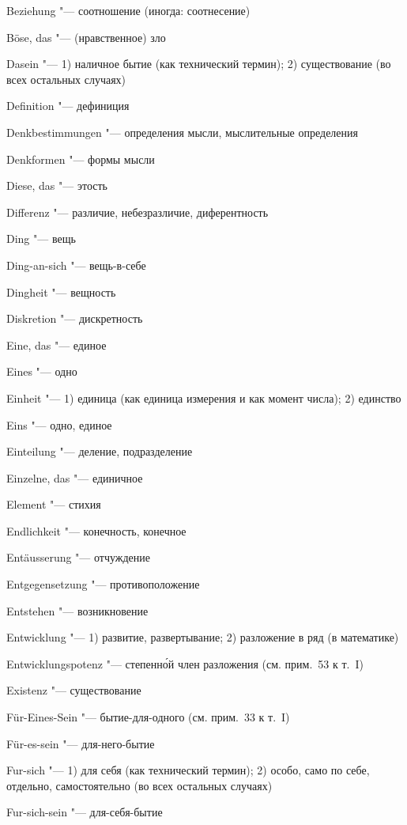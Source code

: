 \begin{multicols}{2}
Beziehung "--- соотношение (иногда: соотнесение)

Böse, das "--- (нравственное) зло

\bigskip

Dasein "--- 1) наличное бытие (как технический термин); 2)
существование (во всех остальных случаях)

Definition "--- дефиниция

Denkbestimmungen "--- определения мысли, мыслительные определения

Denkformen "--- формы мысли

Diese, das "--- этость

Differenz "--- различие, небезразличие, диферентность

Ding "--- вещь

Ding-an-sich "--- вещь-в-себе

Dingheit "--- вещность

Diskretion "--- дискретность

\bigskip

Eine, das "--- единое

Eines "--- одно

Einheit "--- 1) единица (как единица измерения и как момент
числа); 2) единство

Eins "--- одно, единое

Einteilung "--- деление, подразделение

Einzelne, das "--- единичное

Element "--- стихия

Endlichkeit "--- конечность, конечное

Entäusserung "--- отчуждение

Entgegensetzung "--- противоположение

Entstehen "--- возникновение

Entwicklung "--- 1) развитие, развертывание; 2) разложение в ряд (в математике)

Entwicklungspotenz "--- степенн\'{о}й член разложения (см. прим.~53 к т.~I)

Existenz "--- существование

\bigskip

Für-Eines-Sein "--- бытие-для-одного (см. прим.~33 к т.~I)

Für-es-sein "--- для-него-бытие

Fur-sich "--- 1) для себя (как технический термин); 2) особо,
само по себе, отдельно, самостоятельно (во всех остальных случаях)

Fur-sich-sein "--- для-себя-бытие


\end{multicols}
